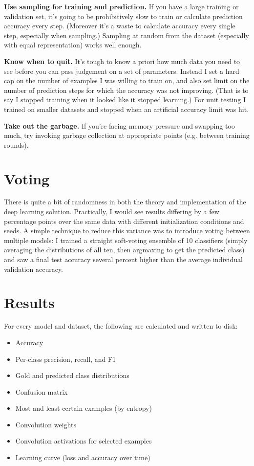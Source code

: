\documentclass{article}
\begin{document}
\textbf{Use sampling for training and prediction.} If you have a large training or validation set, it's going to be prohibitively slow to train or calculate prediction accuracy every step. (Moreover it's a waste to calculate accuracy every single step, especially when sampling.) Sampling at random from the dataset (especially with equal representation) works well enough.

\textbf{Know when to quit.} It's tough to know a priori how much data you need to see before you can pass judgement on a set of parameters. Instead I set a hard cap on the number of examples I was willing to train on, and also set limit on the number of prediction steps for which the accuracy was not improving. (That is to say I stopped training when it looked like it stopped learning.) For unit testing I trained on smaller datasets and stopped when an artificial accuracy limit was hit.

\textbf{Take out the garbage.} If you're facing memory pressure and swapping too much, try invoking garbage collection at appropriate points (e.g. between training rounds).

\section{Voting}

There is quite a bit of randomness in both the theory and implementation of the deep learning solution.  Practically, I would see results differing by a few percentage points over the same data with different initialization conditions and seeds. A simple technique to reduce this variance was to introduce voting between multiple models: I trained a straight soft-voting ensemble of 10 classifiers (simply averaging the distributions of all ten, then argmaxing to get the predicted class) and saw a final test accuracy several percent higher than the average individual validation accuracy.

\section{Results}

For every model and dataset, the following are calculated and written to disk:

\begin{itemize}
  \item Accuracy
  \item Per-class precision, recall, and F1
  \item Gold and predicted class distributions
  \item Confusion matrix
  \item Most and least certain examples (by entropy)
  \item Convolution weights
  \item Convolution activations for selected examples
  \item Learning curve (loss and accuracy over time)
\end{itemize}
\end{document}
